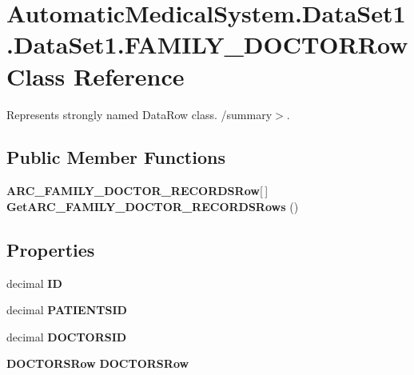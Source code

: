 \section{AutomaticMedicalSystem.DataSet1.DataSet1.FAMILY\_\-DOCTORRow Class Reference}
\label{class_automatic_medical_system_1_1_data_set1_1_1_f_a_m_i_l_y___d_o_c_t_o_r_row}
Represents strongly named DataRow class. /summary$>$.  


\subsection*{Public Member Functions}
\begin{CompactItemize}
\item 
{\bf ARC\_\-FAMILY\_\-DOCTOR\_\-RECORDSRow}[$\,$] \textbf{GetARC\_\-FAMILY\_\-DOCTOR\_\-RECORDSRows} ()\label{class_automatic_medical_system_1_1_data_set1_1_1_f_a_m_i_l_y___d_o_c_t_o_r_row_11270f6300f69114bebae303590ac777}

\end{CompactItemize}
\subsection*{Properties}
\begin{CompactItemize}
\item 
decimal \textbf{ID}\hspace{0.3cm}{\tt  [get, set]}\label{class_automatic_medical_system_1_1_data_set1_1_1_f_a_m_i_l_y___d_o_c_t_o_r_row_f63f0806558c59f68c6cac1da35f3e2d}

\item 
decimal \textbf{PATIENTSID}\hspace{0.3cm}{\tt  [get, set]}\label{class_automatic_medical_system_1_1_data_set1_1_1_f_a_m_i_l_y___d_o_c_t_o_r_row_cfd5b92c9184ac0dd4e0835e7dba4fce}

\item 
decimal \textbf{DOCTORSID}\hspace{0.3cm}{\tt  [get, set]}\label{class_automatic_medical_system_1_1_data_set1_1_1_f_a_m_i_l_y___d_o_c_t_o_r_row_0359c6f6f15f4f5db372c05bce3cbc56}

\item 
{\bf DOCTORSRow} \textbf{DOCTORSRow}\hspace{0.3cm}{\tt  [get, set]}\label{class_automatic_medical_system_1_1_data_set1_1_1_f_a_m_i_l_y___d_o_c_t_o_r_row_e95cc2973907f975e23065616ef8eff7}

\end{CompactItemize}


